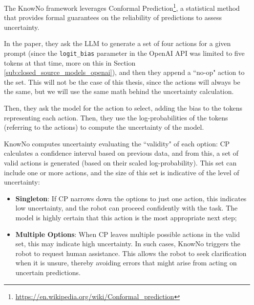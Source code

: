 The KnowNo framework leverages Conformal Prediction\footnote{\url{https://en.wikipedia.org/wiki/Conformal_prediction}},
a statistical method that provides formal guarantees on the reliability of predictions
to assess uncertainty.

In the paper, they ask the LLM to generate a set of four actions for a given
prompt (since the \texttt{logit\_bias} parameter in the OpenAI API was limited
to five tokens at that time, more on this in Section \ref{sub:closed_source_models_openai}),
and then they append a ``no-op" action to the set. This will not be the case of this
thesis, since the actions will always be the same, but we will use the same math
behind the uncertainty calculation.

Then, they ask the model for the action to select, adding the bias to the tokens
representing each action. Then, they use the log-probabilities of the tokens (referring
to the actions) to compute the uncertainty of the model.

KnowNo computes uncertainty evaluating the ``validity" of each option: CP calculates
a confidence interval based on previous data, and from this, a set of valid actions
is generated (based on their scaled log-probability). This set can include one
or more actions, and the size of this set is indicative of the level of uncertainty:
\begin{itemize}
  \item \textbf{Singleton}: If CP narrows down the options to just one action,
    this indicates low uncertainty, and the robot can proceed confidently with the
    task. The model is highly certain that this action is the most appropriate
    next step;

  \item \textbf{Multiple Options}: When CP leaves multiple possible actions in the
    valid set, this may indicate high uncertainty. In such cases, KnowNo
    triggers the robot to request human assistance. This allows the robot to seek
    clarification when it is unsure, thereby avoiding errors that might arise
    from acting on uncertain predictions.
\end{itemize}

